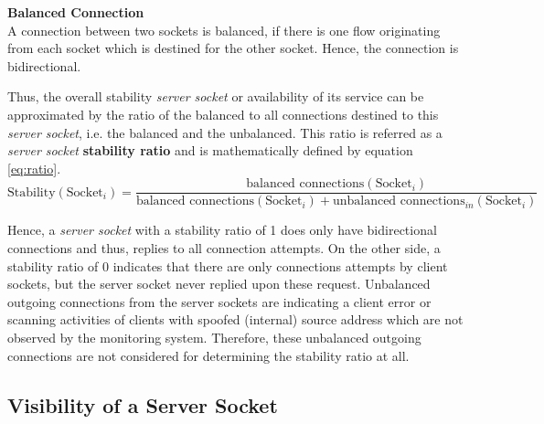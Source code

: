 \parbox{ 
\textwidth}{ 
\begin{defn}
	{\textbf{Balanced Connection}\\} A connection between two sockets is balanced, if there is one flow originating from each socket which is destined for the other socket. Hence, the connection is bidirectional. 
\end{defn}
}

Thus, the overall stability \emph{server socket} or availability of its service can be approximated by the ratio of the balanced to all connections destined to this \emph{server socket}, i.e. the balanced and the unbalanced. This ratio is referred as a \emph{server socket} \textbf{stability ratio} and is mathematically defined by equation \ref{eq:ratio}. 
\begin{equation}
	\text{Stability}(\text{Socket}_i) = \frac{\text{balanced connections}(\text{Socket}_i)}{\text{balanced connections}(\text{Socket}_i) + \text{unbalanced connections}_{in}(\text{Socket}_i)} 
	\label{eq:ratio} 
\end{equation}

Hence, a \emph{server socket} with a stability ratio of 1 does only have bidirectional connections and thus, replies to all connection attempts. On the other side, a stability ratio of 0 indicates that there are only connections attempts by client sockets, but the server socket never replied upon these request. Unbalanced outgoing connections from the server sockets are indicating a client error or scanning activities of clients with spoofed (internal) source address which are not observed by the monitoring system. Therefore, these unbalanced outgoing connections are not considered for determining the stability ratio at all.

\subsection{Visibility of a Server Socket\label{subsection:visibility}}

